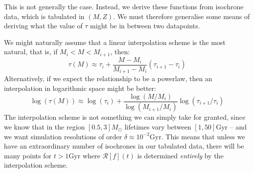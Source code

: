 \documentclass[a4paper,11pt]{article}
\begin{document}
		This is not generally the case. Instead, we derive these functions from isochrone data, which is tabulated in $(M,Z)$. We must therefore generalise some means of deriving what the value of $\tau$ might be in between two datapoints. 

		We might naturally assume that a linear interpolation scheme is the most natural, that is, if $M_i < M < M_{i+1}$, then:
		\begin{equation}
			\tau(M) \approx \tau_i + \frac{M - M_i}{M_{i+1} - M_i} \left(\tau_{i+1} - \tau_i\right)
		\end{equation}
		Alternatively, if we expect the relationship to be a powerlaw, then an interpolation in logarithmic space might be better:
		\begin{equation}
			\log(\tau(M)) \approx \log(\tau_i) + \frac{\log(M/M_i)}{\log(M_{i+1}/M_i)} \log\left(\tau_{i+1}/\tau_i\right)
		\end{equation}
		The interpolation scheme is not something we can simply take for granted, since we know that in the region $[0.5,3]M_\odot$ lifetimes vary between $[1,50]$Gyr -- and we want simulation resolutions of order $\delta \approx 10^{-2}$Gyr. This means that unless we have an extraordinary number of isochrones in our tabulated data, there will be many points for $t > 1$Gyr where $\mathcal{R}[f](t)$ is determined \textit{entirely} by the interpolation scheme.
\end{document}

